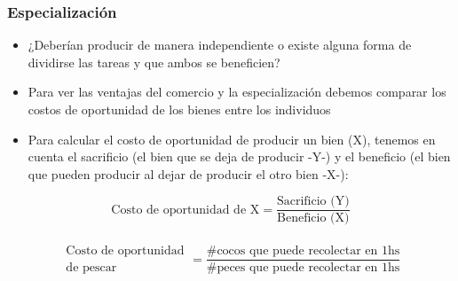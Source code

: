 \documentclass{beamer}
\begin{document}
\begin{frame}
\frametitle{Especialización}

    \begin{itemize}\vspace{4mm}
    \item ¿Deberían producir de manera independiente o existe alguna forma de dividirse las tareas y que ambos se beneficien?
    \item Para ver las ventajas del comercio y la especialización debemos comparar los costos de oportunidad de los bienes entre los individuos
    \end{itemize}
    
\begin{itemize}
    \item Para calcular el costo de oportunidad de producir un bien (X), tenemos en cuenta el sacrificio (el bien que se deja de producir -Y-) y el beneficio (el bien que pueden producir al dejar de producir el otro bien -X-):
\end{itemize}

    \[ \text{Costo de oportunidad de X} = \frac{\text{Sacrificio (Y)}}{\text{Beneficio (X)}} \] \\
    \[ \begin{array}{c}
    \text{Costo de oportunidad} \\
    \text{de pescar}
    \end{array}= \frac{\text{\# cocos que puede recolectar en 1hs}}{\text{\# peces que puede recolectar en 1hs}} \] 
    
\end{frame}
\end{document}
